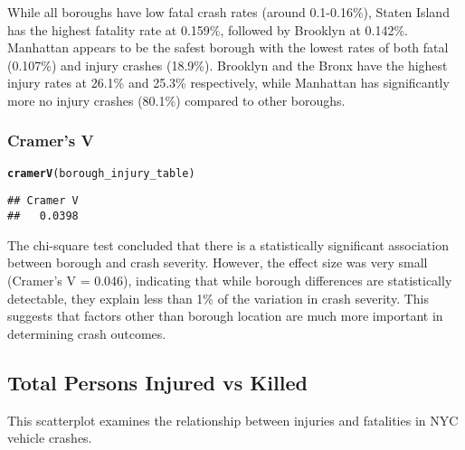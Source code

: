 \documentclass[10pt]{article}\usepackage[]{graphicx}\usepackage[]{xcolor}
\makeatletter
\newcommand{\hldef}[1]{\textcolor[rgb]{0.345,0.345,0.345}{#1}}%
\newcommand{\hlkwd}[1]{\textcolor[rgb]{0.737,0.353,0.396}{\textbf{#1}}}%
\newenvironment{kframe}{%
 \def\at@end@of@kframe{}%
 \ifinner\ifhmode%
  \def\at@end@of@kframe{\end{minipage}}%
  \begin{minipage}{\columnwidth}%
 \fi\fi%
 \def\FrameCommand##1{\hskip\@totalleftmargin \hskip-\fboxsep
 \colorbox{shadecolor}{##1}\hskip-\fboxsep
     \hskip-\linewidth \hskip-\@totalleftmargin \hskip\columnwidth}%
 \MakeFramed {\advance\hsize-\width
   \@totalleftmargin\z@ \linewidth\hsize
   \@setminipage}}%
 {\par\unskip\endMakeFramed%
 \at@end@of@kframe}
\newenvironment{knitrout}{}{} %
\makeatother
\begin{document}
While all boroughs have low fatal crash rates (around 0.1-0.16\%), Staten Island has the highest fatality rate at 0.159\%, followed by Brooklyn at 0.142\%. Manhattan appears to be the safest borough with the lowest rates of both fatal (0.107\%) and injury crashes (18.9\%). Brooklyn and the Bronx have the highest injury rates at 26.1\% and 25.3\% respectively, while Manhattan has significantly more no injury crashes (80.1\%) compared to other boroughs.

\subsubsection{Cramer’s V}

\begin{knitrout}
\color{fgcolor}\begin{kframe}
\begin{alltt}
\hlkwd{cramerV}\hldef{(borough_injury_table)}
\end{alltt}
\begin{verbatim}
## Cramer V 
##   0.0398
\end{verbatim}
\end{kframe}
\end{knitrout}

The chi-square test concluded that there is a statistically significant association between borough and crash severity. However, the effect size was very small (Cramer's V = 0.046), indicating that while borough differences are statistically detectable, they explain less than 1\% of the variation in crash severity. This suggests that factors other than borough location are much more important in determining crash outcomes.

\subsection{Total Persons Injured vs Killed}

This scatterplot examines the relationship between injuries and fatalities in NYC vehicle crashes.
\end{document}
